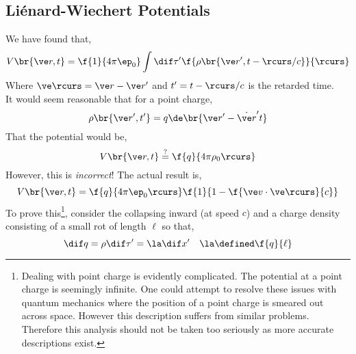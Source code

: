 \documentclass{article}
\begin{document}
\subsection{Liénard-Wiechert Potentials}

We have found that,
\[ V\br{\ve r, t} = \f{1}{4 \pi \ep_0} \int \dif \tau' \f{\rho\br{\ve r', t - \rcurs/c}}{\rcurs} \]
Where $\ve \rcurs = \ve r - \ve r'$ and $t' = t - \rcurs/c$ is the retarded time.\\

It would seem reasonable that for a point charge,
\[ \rho\br{\ve r', t'} = q \de\br{\ve r' - \dot{\ve r}' t} \]
That the potential would be,
\[ V\br{\ve r, t} \stackrel{?}{=} \f{q}{4 \pi \rho_0 \rcurs} \]
However, this is \textit{incorrect}! The actual result is,
\[ V\br{\ve r, t} = \f{q}{4 \pi \ep_0 \rcurs} \f{1}{1 - \f{\ve v \cdot \ve \rcurs}{c}} \]
To prove this\footnote{Dealing with point charge is evidently complicated. The potential at a point charge is seemingly infinite. One could attempt to resolve these issues with quantum mechanics where the position of a point charge is smeared out across space. However this description suffers from similar problems. Therefore this analysis should not be taken too seriously as more accurate descriptions exist.}, consider the  collapsing inward (at speed $c$) and a charge density consisting of a small rot of length $\ell$ so that,
\[ \dif q = \rho \dif \tau' = \la \dif x' \quad \la \defined \f{q}{\ell} \]
\begin{center}
\end{center}
\end{document}
